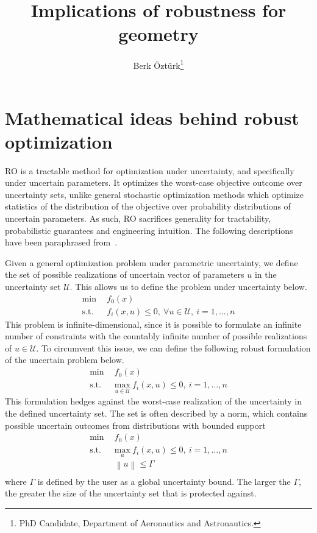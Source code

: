 \documentclass[journal]{new-aiaa}
\title{Implications of robustness for geometry}
\author{Berk {\"O}zt{\"u}rk\footnote{PhD Candidate, Department of Aeronautics and Astronautics.}}
\affil{Massachusetts Institute of Technology, Cambridge, MA, 02139}
\begin{document}
\maketitle



\printglossary

\section{Mathematical ideas behind robust optimization}

RO is a tractable method for optimization under uncertainty, and specifically under uncertain
parameters. It optimizes the worst-case objective outcome over uncertainty sets,
unlike general stochastic optimization methods which optimize statistics of the distribution
of the objective over probability distributions of uncertain parameters. As such, RO
sacrifices generality for tractability, probabilistic guarantees and engineering intuition. The following
descriptions have been paraphrased from~\cite{Ozturk2019}.

Given a general optimization problem under parametric uncertainty, we define the set of possible
realizations of uncertain vector of parameters $u$ in the uncertainty set $\mathcal{U}$. This
allows us to define the problem under uncertainty below.
\begin{align*}
    \text{min} &~~f_0(x) \\
    \text{s.t.}     &~~f_i(x,u) \leq 0,~\forall u \in \mathcal{U},~i = 1,\ldots,n
\end{align*}
This problem is infinite-dimensional, since it is possible to formulate an infinite number of constraints
with the countably infinite number of possible realizations of $u \in \mathcal{U}$. To circumvent this issue,
we can define the following robust formulation of the uncertain problem below.
\begin{align*}
    \text{min} &~~f_0(x) \\
    \text{s.t.}     &~~\underset{u \in \mathcal{U}}{\text{max}}~f_i(x,u) \leq 0,~i = 1,\ldots,n
\end{align*}
This formulation hedges against the worst-case realization of the uncertainty in the defined uncertainty
set. The set is often described by a norm, which contains possible uncertain outcomes from distributions with
bounded support
\begin{equation}
    \begin{split}
        \text{min} &~~f_0(x) \\
    \text{s.t.}     &~~\underset{u}{\text{max}}~f_i(x,u) \leq 0,~i = 1,\ldots,n \\
                    &~~\left\lVert u \right\rVert \leq \Gamma \\
        \end{split}
    \label{eq:normform}
\end{equation}
where $\Gamma$ is defined by the user as a global uncertainty bound. The larger the $\Gamma$,
the greater the size of the uncertainty set that is protected against.
\end{document}
